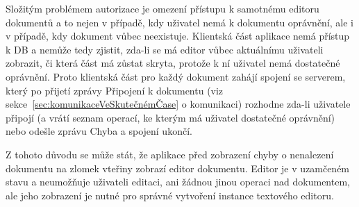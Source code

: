 Složitým problémem autorizace je omezení přístupu k samotnému editoru dokumentů a to nejen v případě, kdy uživatel nemá k dokumentu oprávnění, ale i v případě, kdy dokument vůbec neexistuje.
Klientská část aplikace nemá přístup k DB a nemůže tedy zjistit, zda-li se má editor vůbec aktuálnímu uživateli zobrazit, či která část má zůstat skryta, protože k ní uživatel nemá dostatečné oprávnění.
Proto klientská část pro každý dokument zahájí spojení se serverem, který po přijetí zprávy Připojení k dokumentu (viz sekce~\ref{sec:komunikaceVeSkutečnémČase} o komunikaci) rozhodne zda-li uživatele připojí (a vrátí seznam operací, ke kterým má uživatel dostatečné oprávnění) nebo odešle zprávu Chyba a spojení ukončí.

Z tohoto důvodu se může stát, že aplikace před zobrazení chyby o nenalezení dokumentu na zlomek vteřiny zobrazí editor dokumentu.
Editor je v uzamčeném stavu a neumožňuje uživateli editaci, ani žádnou jinou operaci nad dokumentem, ale jeho zobrazení je nutné pro správné vytvoření instance textového editoru.
